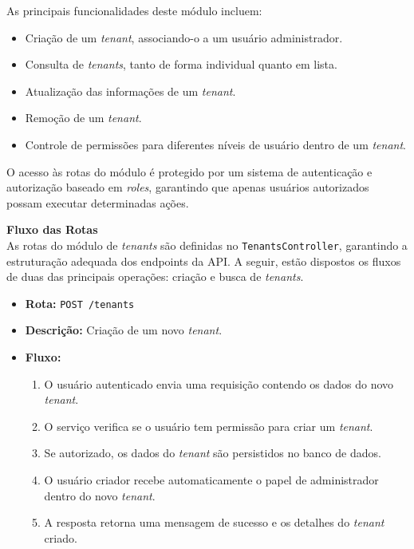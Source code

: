 As principais funcionalidades deste módulo incluem:

\begin{itemize}
    \item Criação de um \textit{tenant}, associando-o a um usuário administrador.
    \item Consulta de \textit{tenants}, tanto de forma individual quanto em lista.
    \item Atualização das informações de um \textit{tenant}.
    \item Remoção de um \textit{tenant}.
    \item Controle de permissões para diferentes níveis de usuário dentro de um \textit{tenant}.
\end{itemize}

O acesso às rotas do módulo é protegido por um sistema de autenticação e autorização baseado em \textit{roles}, garantindo que apenas usuários autorizados possam executar determinadas ações.

\noindent\textbf{Fluxo das Rotas} \\
As rotas do módulo de \textit{tenants} são definidas no \texttt{TenantsController}, garantindo a estruturação adequada dos endpoints da API. A seguir, estão dispostos os fluxos de duas das principais operações: criação e busca de \textit{tenants}.

\begin{itemize}
	\item \textbf{Rota:} \texttt{POST /tenants}
	\item \textbf{Descrição:} Criação de um novo \textit{tenant}.
	\item \textbf{Fluxo:}
	\begin{enumerate}
    \item O usuário autenticado envia uma requisição contendo os dados do novo \textit{tenant}.
    \item O serviço verifica se o usuário tem permissão para criar um \textit{tenant}.
    \item Se autorizado, os dados do \textit{tenant} são persistidos no banco de dados.
    \item O usuário criador recebe automaticamente o papel de administrador dentro do novo \textit{tenant}.
    \item A resposta retorna uma mensagem de sucesso e os detalhes do \textit{tenant} criado.
	\end{enumerate}
\end{itemize}

